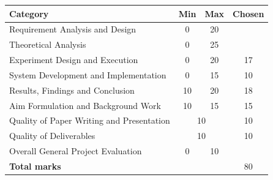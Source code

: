 \documentclass{sig-alternate-05-2015}
\begin{document}
	\renewcommand{\arraystretch}{1.25}
	\begin{tabular}{|l|c|c|c|}
		\hline
		\textbf{Category} & \textbf{Min} & \textbf{Max} & \textbf{Chosen} \\ \hline \hline
		Requirement Analysis and Design & 0 & 20 &
		 \\ \hline
		Theoretical Analysis & 0 & 25 &
		 \\ \hline
		Experiment Design and Execution & 0 & 20 &
		17 \\ \hline
		System Development and Implementation & 0 & 15 &
		10 \\ \hline
		Results, Findings and Conclusion & 10 & 20 &
		18 \\ \hline
		Aim Formulation and Background Work & 10 & 15 &
		15 \\ \hline
		Quality of Paper Writing and Presentation & \multicolumn{2}{c|}{10} &
		10 \\ \hline
		Quality of Deliverables & \multicolumn{2}{c|}{10} &
		10 \\ \hline
		Overall General Project Evaluation & 0 & 10 &
		\\ \hline
		\hline
		\multicolumn{3}{|l|}{\textbf{Total marks}} & 80 \\ \hline
	\end{tabular}
	
	\endgroup
	\thispagestyle{empty}
	\newpage
	\setcounter{page}{1}
	
	
	
	
	
	
	
	
	
\end{document}
